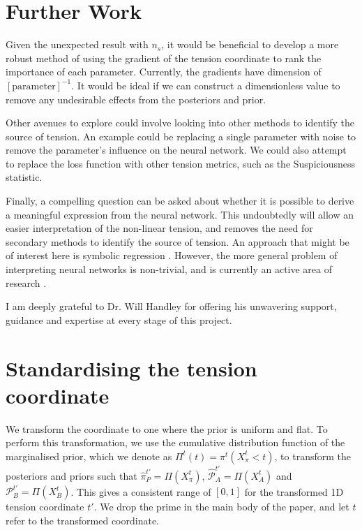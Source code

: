 \documentclass[%
 reprint,
 amsmath,amssymb,
 aps,
]{revtex4-2}
\begin{document}
\section{Further Work}

Given the unexpected result with $n_s$, it would be beneficial to develop a more robust method of using the gradient of the tension coordinate to rank the importance of each parameter. Currently, the gradients have dimension of $[\textrm{parameter}]^{-1}$. It would be ideal if we can construct a dimensionless value to remove any undesirable effects from the posteriors and prior.

Other avenues to explore could involve looking into other methods to identify the source of tension. An example could be replacing a single parameter with noise to remove the parameter's influence on the neural network. We could also attempt to replace the loss function with other tension metrics, such as the Suspiciousness statistic. 

Finally, a compelling question can be asked about whether it is possible to derive a meaningful expression from the neural network. This undoubtedly will allow an easier interpretation of the non-linear tension, and removes the need for secondary methods to identify the source of tension. An approach that might be of interest here is symbolic regression \cite{Udrescu2020}. However, the more general problem of interpreting neural networks is non-trivial, and is currently an active area of research \cite{Montavon2018}.






\begin{acknowledgments}
I am deeply grateful to Dr. Will Handley for offering his unwavering support, guidance and expertise at every stage of this project.
\end{acknowledgments}

\appendix

\section{Standardising the tension coordinate} \label{appendix:standardising}

We transform the coordinate to one where the prior is uniform and flat. To perform this transformation, we use the cumulative distribution function of the marginalised prior, which we denote as $\Pi^t(t) = \pi^t(X_\pi^t < t)$, to transform the posteriors and priors such that $\hat{\pi}^{t'}_P = \Pi(X_\pi^t)$, $\hat{\mathcal{P}}_A^{t'} = \Pi(X_A^t)$ and $\mathcal{P}_B^{t'} = \Pi(X_B^t)$. This gives a consistent range of $[0, 1]$ for the transformed 1D tension coordinate $t'$. We drop the prime in the main body of the paper, and let $t$ refer to the transformed coordinate.
\end{document}
